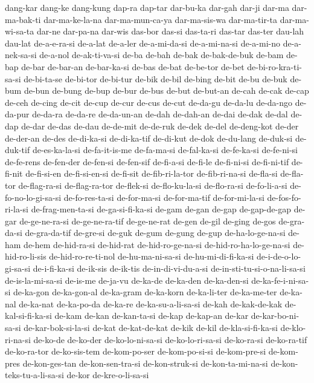{dang-kar dang-ke dang-kung dap-ra dap-tar dar-bu-ka dar-gah dar-ji dar-ma
dar-ma-bak-ti dar-ma-ke-la-na dar-ma-mun-ca-ya dar-ma-sis-wa dar-ma-tir-ta
dar-ma-wi-sa-ta dar-ne dar-pa-na dar-wis das-bor das-si das-ta-ri das-tar
das-ter dau-lah dau-lat de-a-e-ra-si de-a-lat de-a-ler de-a-mi-da-si
de-a-mi-na-si de-a-mi-no de-a-nek-sa-si de-a-nol de-ak-ti-va-si de-ba
de-bah de-bak de-bak-de-buk de-bam de-bap de-bar de-bar-an de-bar-ka-si
de-bas de-bat de-be-tor de-bet de-bi-ro-kra-ti-sa-si de-bi-ta-se de-bi-tor
de-bi-tur de-bik de-bil de-bing de-bit de-bu de-buk de-bum de-bun de-bung
de-bup de-bur de-bus de-but de-but-an de-cah de-cak de-cap de-ceh de-cing
de-cit de-cup de-cur de-cus de-cut de-da-gu de-da-lu de-da-ngo de-da-pur
de-da-ra de-da-re de-da-un-an de-dah de-dah-an de-dai de-dak de-dal de-dap
de-dar de-das de-dau de-de-mit de-de-ruk de-dek de-del de-deng-kot de-der
de-der-an de-des de-di-ka-si de-di-ka-tif de-di-kut de-dok de-du-lang
de-duk-si de-duk-tif de-es-ka-la-si de-fa-it-is-me de-fa-ma-si
de-fal-ka-si de-fe-ka-si de-fe-ni-si de-fe-rens de-fen-der de-fen-si
de-fen-sif de-fi-a-si de-fi-le de-fi-ni-si de-fi-ni-tif de-fi-nit
de-fi-si-en de-fi-si-en-si de-fi-sit de-fib-ri-la-tor de-fib-ri-na-si
de-fla-si de-fla-tor de-flag-ra-si de-flag-ra-tor de-flek-si
de-flo-ku-la-si de-flo-ra-si de-fo-li-a-si de-fo-no-lo-gi-sa-si
de-fo-res-ta-si de-for-ma-si de-for-ma-tif de-for-mi-la-si
de-fos-fo-ri-la-si de-frag-men-ta-si de-ga-si-fi-ka-si de-gam de-gan
de-gap de-gap-de-gap de-gar de-ge-ne-ra-si de-ge-ne-ra-tif de-ge-ne-rat
de-gen de-gil de-ging de-gos de-gra-da-si de-gra-da-tif de-gre-si de-guk
de-gum de-gung de-gup de-ha-lo-ge-na-si de-ham de-hem de-hid-ra-si
de-hid-rat de-hid-ro-ge-na-si de-hid-ro-ha-lo-ge-na-si de-hid-ro-li-sis
de-hid-ro-re-ti-nol de-hu-ma-ni-sa-si de-hu-mi-di-fi-ka-si
de-i-de-o-lo-gi-sa-si de-i-fi-ka-si de-ik-sis de-ik-tis
de-in-di-vi-du-a-si de-in-sti-tu-si-o-na-li-sa-si de-is-la-mi-sa-si
de-is-me de-ja-vu de-ka-de de-ka-den de-ka-den-si de-ka-fe-i-ni-sa-si
de-ka-gon de-ka-gon-al de-ka-gram de-ka-korn de-ka-li-ter de-ka-me-ter
de-ka-nal de-ka-nat de-ka-po-da de-ka-re de-ka-su-a-li-sa-si de-kah
de-kak-de-kak de-kal-si-fi-ka-si de-kam de-kan de-kan-ta-si de-kap
de-kap-an de-kar de-kar-bo-ni-sa-si de-kar-bok-si-la-si de-kat
de-kat-de-kat de-kik de-kil de-kla-si-fi-ka-si de-klo-ri-na-si de-ko-de
de-ko-der de-ko-lo-ni-sa-si de-ko-lo-ri-sa-si de-ko-ra-si de-ko-ra-tif
de-ko-ra-tor de-ko-sis-tem de-kom-po-ser de-kom-po-si-si de-kom-pre-si
de-kom-pres de-kon-ges-tan de-kon-sen-tra-si de-kon-struk-si
de-kon-ta-mi-na-si de-kon-teks-tu-a-li-sa-si de-kor de-kre-o-li-sa-si
}
